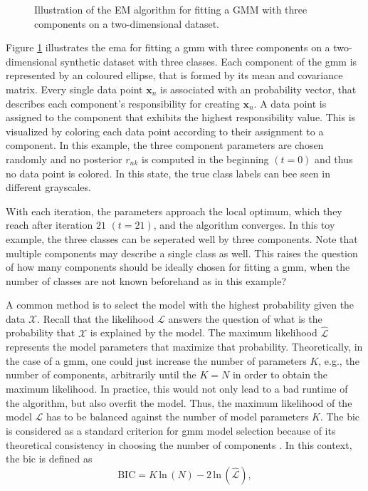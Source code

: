 \documentclass[../../../main.tex]{subfiles}
\begin{document}
 \begin{figure}[b!]
    \centering
    
    \caption{Illustration of the EM algorithm for fitting a GMM with three components on a two-dimensional dataset.}
    \label{fig:em_algo_gmm}
\end{figure}

Figure \ref{fig:em_algo_gmm} illustrates the \gls{ema} for fitting a \gls{gmm} with three components on a two-dimensional synthetic dataset with three classes. Each component of the \gls{gmm} is represented by an coloured ellipse, that is formed by its mean and covariance matrix. Every single data point $\bm{x}_n$ is associated with an probability vector, that describes each component's responsibility for creating $\bm{x}_n$. A data point is assigned to the component that exhibits the highest responsibility value. This is visualized by coloring each data point according to their assignment to a component. In this example, the three component parameters are chosen randomly and no posterior $r_{nk}$ is computed in the beginning $(t=0)$ and thus no data point is colored. In this state, the true class labels can bee seen in different grayscales. 

With each iteration, the parameters approach the local optimum, which they reach after iteration $21$ $(t=21)$, and the algorithm converges. In this toy example, the three classes can be seperated well by three components. Note that multiple components may describe a single class as well. This raises the question of how many components should be ideally chosen for fitting a \gls{gmm}, when the number of classes are not known beforehand as in this example? 

A common method is to select the model with the highest probability given the data $\mathcal{X}$. Recall that the likelihood $\mathcal{L}$ answers the question of what is the probability that $\mathcal{X}$ is explained by the model. The maximum likelihood $\hat{\mathcal{L}}$ represents the model parameters that maximize that probability. Theoretically, in the case of a \gls{gmm}, one could just increase the number of parameters $K$, e.g., the number of components, arbitrarily until the $K = N$ in order to obtain the maximum likelihood. In practice, this would not only lead to a bad runtime of the algorithm, but also overfit the model. Thus, the maximum likelihood of the model $\hat{\mathcal{L}}$ has to be balanced against the number of model parameters $K$. The \gls{bic} is considered as a standard criterion for \gls{gmm} model selection because of its theoretical consistency in choosing the number of components \cite{keribin2000consistent}. In this context, the \gls{bic} is defined as
\begin{equation}
    \text{BIC} = K \, \text{ln} \, (N) - 2 \, \text{ln} \, (\hat{\mathcal{L}}),
\end{equation}
\end{document}
